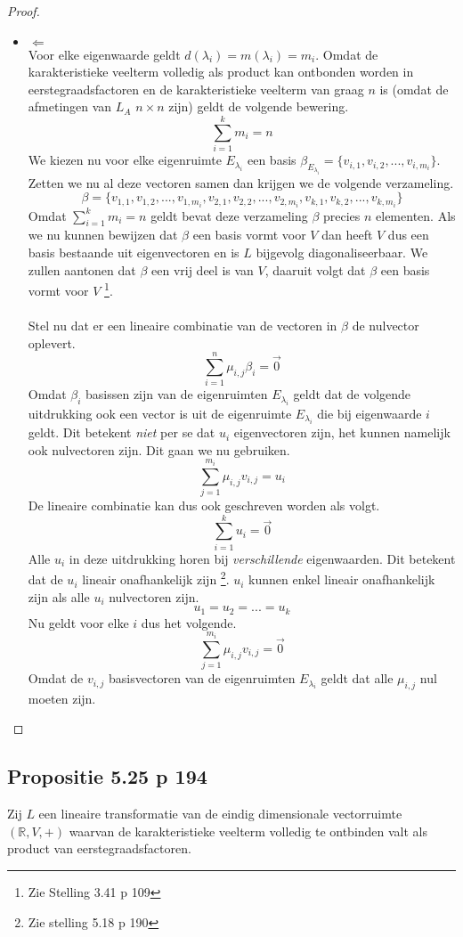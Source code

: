 \documentclass[lineaire_algebra_oplossingen.tex]{subfiles}
\begin{document}
\begin{proof}
\begin{itemize}
\item $\Leftarrow$\\
Voor elke eigenwaarde geldt $d(\lambda_i) = m(\lambda_i) = m_i$.
Omdat de karakteristieke veelterm volledig als product kan ontbonden worden in eerstegraadsfactoren en de karakteristieke veelterm van graag $n$ is (omdat de afmetingen van $L_A$ $n\times
n$ zijn) geldt de volgende bewering.
\[
\sum_{i=1}^km_i = n
\]
We kiezen nu voor elke eigenruimte $E_{\lambda_i}$ een basis $\beta_{E_{\lambda_i}} = \{v_{i,1},v_{i,2},...,v_{i,m_i}\}$. Zetten we nu al deze vectoren samen dan krijgen we de volgende verzameling.
\[
\beta = 
\{
v_{1,1},v_{1,2},...,v_{1,m_i},v_{2,1},v_{2,2},...,v_{2,m_i},v_{k,1},v_{k,2},...,v_{k,m_i}
\}
\]
Omdat $\sum_{i=1}^km_i = n$ geldt bevat deze verzameling $\beta$ precies $n$ elementen.
Als we nu kunnen bewijzen dat $\beta$ een basis vormt voor $V$ dan heeft $V$ dus een basis bestaande uit eigenvectoren en is $L$ bijgevolg diagonaliseerbaar. We zullen aantonen dat $\beta$ een vrij deel is van $V$, daaruit volgt dat $\beta$ een basis vormt voor $V$ \footnote{Zie Stelling 3.41 p 109}.\\\\
Stel nu dat er een lineaire combinatie van de vectoren in $\beta$ de nulvector oplevert.
\[
\sum_{i=1}^n\mu_{i,j}\beta_i = \vec{0}
\]
Omdat $\beta_i$ basissen zijn van de eigenruimten $E_{\lambda_i}$ geldt dat de volgende uitdrukking ook een vector is uit de eigenruimte $E_{\lambda_i}$ die bij eigenwaarde $i$ geldt. Dit betekent \emph{niet} per se dat $u_i$ eigenvectoren zijn, het kunnen namelijk ook nulvectoren zijn. Dit gaan we nu gebruiken.
\[
\sum_{j=1}^{m_i} \mu_{i,j}v_{i,j} = u_i
\]
De lineaire combinatie kan dus ook geschreven worden als volgt.
\[
\sum_{i=1}^ku_i = \vec{0}
\]
Alle $u_i$ in deze uitdrukking horen bij \emph{verschillende} eigenwaarden. Dit betekent dat de $u_i$ lineair onafhankelijk zijn \footnote{Zie stelling 5.18 p 190}. $u_i$ kunnen enkel lineair onafhankelijk zijn als alle $u_i$ nulvectoren zijn.
\[
u_1 = u_2 = ... = u_k
\]
Nu geldt voor elke $i$ dus het volgende.
\[
\sum_{j=1}^{m_i} \mu_{i,j}v_{i,j} = \vec{0}
\]
Omdat de $v_{i,j}$ basisvectoren van de eigenruimten $E_{\lambda_i}$ geldt dat alle $\mu_{i,j}$ nul moeten zijn.
\end{itemize}
\end{proof}


\subsection{Propositie 5.25 p 194}
Zij $L$ een lineaire transformatie van de eindig dimensionale vectorruimte $(\mathbb{R},V,+)$ waarvan de karakteristieke veelterm volledig te ontbinden valt als product van eerstegraadsfactoren.
\end{document}
